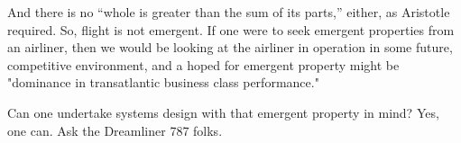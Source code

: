 And there is no ``whole is greater than the sum of its parts,'' either, as Aristotle required. So, flight is not emergent. If one were to seek emergent properties from an airliner, then we would be looking at the airliner in operation in some future, competitive environment, and a hoped for emergent property might be "dominance in transatlantic business class performance."

Can one undertake systems design with that emergent property in mind? Yes, one can. Ask the Dreamliner 787 folks.
